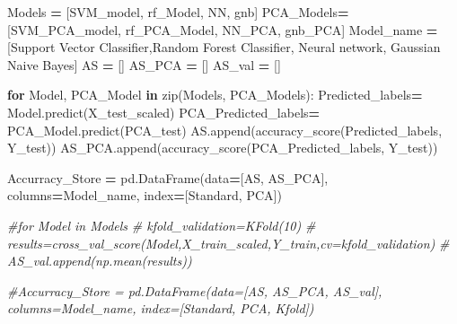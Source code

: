 \documentclass[
]{article}
\newenvironment{Shaded}{\begin{snugshade}}{\end{snugshade}}
\newcommand{\BuiltInTok}[1]{#1}
\newcommand{\CommentTok}[1]{\textcolor[rgb]{0.56,0.35,0.01}{\textit{#1}}}
\newcommand{\ControlFlowTok}[1]{\textcolor[rgb]{0.13,0.29,0.53}{\textbf{#1}}}
\newcommand{\KeywordTok}[1]{\textcolor[rgb]{0.13,0.29,0.53}{\textbf{#1}}}
\newcommand{\NormalTok}[1]{#1}
\newcommand{\OperatorTok}[1]{\textcolor[rgb]{0.81,0.36,0.00}{\textbf{#1}}}
\newcommand{\StringTok}[1]{\textcolor[rgb]{0.31,0.60,0.02}{#1}}
\begin{document}
\begin{Shaded}
\begin{Highlighting}[]
\NormalTok{Models }\OperatorTok{=}\NormalTok{ [SVM\_model, rf\_Model, NN, gnb]}
\NormalTok{PCA\_Models}\OperatorTok{=}\NormalTok{ [SVM\_PCA\_model, rf\_PCA\_Model, NN\_PCA, gnb\_PCA]}
\NormalTok{Model\_name }\OperatorTok{=}\NormalTok{ [}\StringTok{\textquotesingle{}Support Vector Classifier\textquotesingle{}}\NormalTok{,}\StringTok{\textquotesingle{}Random Forest Classifier\textquotesingle{}}\NormalTok{, }\StringTok{\textquotesingle{}Neural network\textquotesingle{}}\NormalTok{, }\StringTok{\textquotesingle{}Gaussian Naive Bayes\textquotesingle{}}\NormalTok{]}
\NormalTok{AS }\OperatorTok{=}\NormalTok{ []}
\NormalTok{AS\_PCA }\OperatorTok{=}\NormalTok{ []}
\NormalTok{AS\_val }\OperatorTok{=}\NormalTok{ []}


\ControlFlowTok{for}\NormalTok{ Model, PCA\_Model }\KeywordTok{in} \BuiltInTok{zip}\NormalTok{(Models, PCA\_Models):}
\NormalTok{  Predicted\_labels}\OperatorTok{=}\NormalTok{ Model.predict(X\_test\_scaled)}
\NormalTok{  PCA\_Predicted\_labels}\OperatorTok{=}\NormalTok{ PCA\_Model.predict(PCA\_test)}
\NormalTok{  AS.append(accuracy\_score(Predicted\_labels, Y\_test)) }
\NormalTok{  AS\_PCA.append(accuracy\_score(PCA\_Predicted\_labels, Y\_test))}

\NormalTok{Accurracy\_Store }\OperatorTok{=}\NormalTok{ pd.DataFrame(data}\OperatorTok{=}\NormalTok{[AS, AS\_PCA], columns}\OperatorTok{=}\NormalTok{Model\_name, index}\OperatorTok{=}\NormalTok{[}\StringTok{\textquotesingle{}Standard\textquotesingle{}}\NormalTok{, }\StringTok{\textquotesingle{}PCA\textquotesingle{}}\NormalTok{])}


\CommentTok{\#for Model in Models}
\CommentTok{\#  kfold\_validation=KFold(10)}
\CommentTok{\#  results=cross\_val\_score(Model,X\_train\_scaled,Y\_train,cv=kfold\_validation)}
\CommentTok{\#  AS\_val.append(np.mean(results))}

\CommentTok{\#Accurracy\_Store = pd.DataFrame(data=[AS, AS\_PCA, AS\_val], columns=Model\_name, index=[\textquotesingle{}Standard\textquotesingle{}, \textquotesingle{}PCA\textquotesingle{}, \textquotesingle{}Kfold\textquotesingle{}])}
\end{Highlighting}
\end{Shaded}
\end{document}
